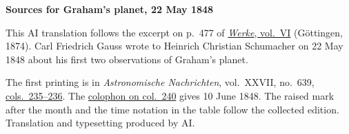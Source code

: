 \clearpage\thispagestyle{empty}
\begin{center}\textbf{Sources for Graham’s planet, 22 May 1848}\end{center}
\noindent This AI translation follows the excerpt on p.~477 of \href{https://gdz.sub.uni-goettingen.de/id/PPN236007467}{\textit{Werke}, vol.~VI} (Göttingen, 1874). Carl Friedrich Gauss wrote to Heinrich Christian Schumacher on 22 May 1848 about his first two observations of Graham’s planet.
\par\smallskip\noindent The first printing is in \textit{Astronomische Nachrichten}, vol.~XXVII, no.~639, \href{https://api.digitale-sammlungen.de/iiif/image/v2/bsb10049452_00126/full/1800,/0/default.jpg}{cols.~235--236}. The \href{https://api.digitale-sammlungen.de/iiif/image/v2/bsb10049452_00128/full/1800,/0/default.jpg}{colophon on col.~240} gives 10 June 1848. The raised mark after the month and the time notation in the table follow the collected edition. Translation and typesetting produced by AI.
\clearpage
